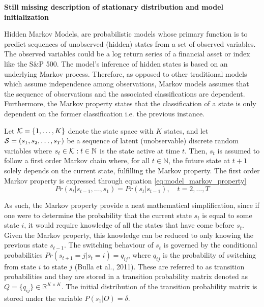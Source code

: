 \textbf{Still missing description of stationary distribution and model initialization}

Hidden Markov Models, are probabilistic models whose primary function is to predict sequences of unobserved (hidden) states from a set of observed variables. The observed variables could be a log return series of a financial asset or index like the S\&P 500. The model’s inference of hidden states is based on an underlying Markov process. Therefore, as opposed to other traditional models which assume independence among observations, Markov models assumes that the sequence of observations and the associated classifications are dependent. Furthermore, the Markov property states that the classification of a state is only dependent on the former classification i.e. the previous instance. 

Let $\K=\{ 1,\ldots, K \}$ denote the state space with $K$ states, and let $\S=(s_1,s_2,\ldots,s_T)$ be a sequence of latent (unobservable) discrete random variables where $s_t\in\K: t\in \mathbb{N}$ is the state active at time $t$. Then, $s_t$ is assumed to follow a first order Markov chain where, for all $t \in \mathbb{N}$, the future state at $t + 1$ solely depends on the current state, fulfilling the Markov property. The first order Markov property is expressed through equation \ref{eq:model_markov_property}
\begin{equation}
    Pr(s_t | s_{t-1},\ldots,s_1) = Pr(s_t | s_{t-1}),
    \quad t=2,\ldots,T
    \label{eq:model_markov_property}
\end{equation} 

As such, the Markov property provide a neat mathematical simplification, since if one were to determine the probability that the current state $s_t$ is equal to some state $i$, it would require knowledge of all the states that have come before $s_t$. Given the Markov property, this knowledge can be reduced to only knowing the previous state $s_{t-1}$. The switching behaviour of $s_t$ is governed by the conditional probabilities $Pr(s_{t+1} = j| s_t = i) = q_{ij}$, where $q_{ij}$ is the probability of switching from state $i$ to state $j$ (Bulla et al., 2011). These are referred to as transition probabilities and they are stored in a transition probability matrix denoted as $Q = \{q_{ij}\} \in \mathbb{R}^{K \times K}$. The initial distribution of the transition probability matrix is stored under the variable $P(s_1|O)= \delta$.

